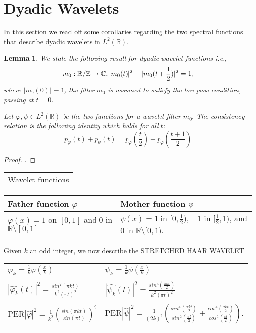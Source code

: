 \documentclass{birkmult}
\newtheorem{lem}[thm]{Lemma}
\theoremstyle{definition}
\theoremstyle{remark}
\numberwithin{equation}{section}
\begin{document}
\section{Dyadic Wavelets}
\label{sec:5a}
In this section we read off some corollaries regarding the two spectral 
functions that describe dyadic wavelets in $L^{2}(\mathbb{R})$.
\begin{lem}
\label{L:dl}
We state the following result for dyadic wavelet functions i.e., 
\[
  m_{0}: \mathbb{R}/\mathbb{Z} \to \mathbb{C}, \\
  |m_{0}(t)|^{2} + |m_{0}(t+\frac{1}{2})|^{2}=1,
\]
where $|m_{0}(0)|=1$, the filter $m_{0}$ is assumed to satisfy the 
low-pass condition, passing at $t = 0$.

Let $\varphi, \psi \in L^{2}(\mathbb{R})$ be the two functions for a wavelet 
filter $m_{0}$.  The consistency relation is the following identity which 
holds for all $t$:
\[
  p_{\varphi}(t)+p_{\psi}(t)=p_{\varphi}(\frac{t}{2})+p_{\varphi}(\frac{t+1}{2})
\]
\end{lem}
\begin{proof}
\cite{BJMP05}.
\end{proof}

\begin{center}
\begin{tabular}{c}
Wavelet functions
\end{tabular}
\begin{tabular}{l|l}
\hline
Father function $\varphi$  & Mother function $\psi$\\
\hline
$\varphi(x)= 1$ on $[0,1]$ and $0$ in $\mathbb{R} \setminus [0,1]$ & 
$\psi(x)=1$ in $[0, \frac{1}{2})$, $-1$ in $[\frac{1}{2}, 1)$, and
$0$ in $\mathbb{R} \setminus [0,1)$. \\
\hline
\end{tabular}
\end{center}

Given $k$ an odd integer, we now describe the STRETCHED HAAR WAVELET 

\begin{center}
\begin{tabular}{l|l}
  \\
  $\varphi_{k}=\frac{1}{k}\varphi(\frac{x}{k})$ \text{   } & \text{   } $\psi_{k}=\frac{1}{k}\psi(\frac{x}{k})$ \\
  \\
  $|\widehat{\varphi_{k}}(t)|^{2}=\frac{sin^{2}(\pi kt)}{k^{2}(\pi t)^{2}}$ \text{   } & \text{   }  
  $|\widehat{\psi_{k}}(t)|^{2}=\frac{sin^{4}(\frac{\pi kt}{2})}{k^{2}(\pi t)^{2}}$ \\ \\
  $\text{PER}|\widehat{\varphi}|^{2}= \frac{1}{k^{2}}(\frac{sin(\pi kt)}{sin(\pi t)})^{2}$ \text{   } & \text{   }  
  $\text{PER}|\widehat{\psi}|^{2}= \frac{1}{(2k)^{2}}
(\frac{sin^{4}(\frac{\pi kt}{2})}{sin^{2}(\frac{\pi t}{2})}
+\frac{cos^{4}(\frac{\pi kt}{2})}{cos^{2}(\frac{\pi t}{2})})$. \\
  \\
\end{tabular}
\end{center}
\end{document}
